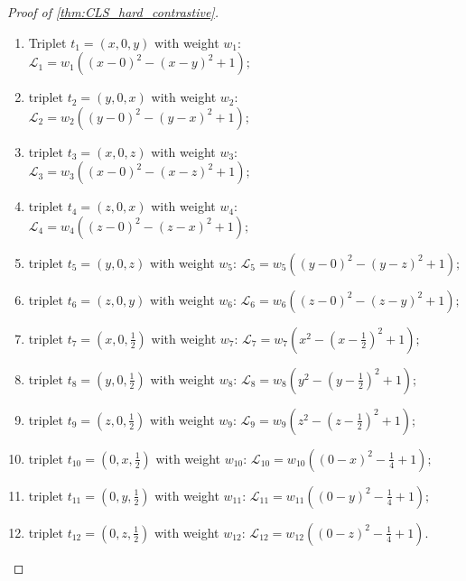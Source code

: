 \documentclass{article}
\theoremstyle{definition}  %
\theoremstyle{plain}
\numberwithin{observation}{section}
\numberwithin{claim}{section}
\numberwithin{fact}{section}
\numberwithin{lemma}{section}
\numberwithin{proposition}{section}
\numberwithin{theorem}{section}
\numberwithin{corollary}{section}
\numberwithin{definition}{section}
\theoremstyle{plain}
\begin{document}
\begin{proof}[Proof of \cref{thm:CLS_hard_contrastive}]
\begin{enumerate}[label = ]
    \item Triplet $t_1 = (x, 0, y)$ with weight $w_1$: $\mathcal{L}_1 = w_1 \left((x - 0)^2 - (x - y)^2 + 1\right);$
    \item triplet $t_2 = (y, 0, x)$ with weight $w_2$: $\mathcal{L}_2 = w_2 \left((y - 0)^2 - (y - x)^2 + 1\right);$
    \item triplet $t_3 = (x, 0, z)$ with weight $w_3$: $\mathcal{L}_3 = w_3 \left((x - 0)^2 - (x - z)^2 + 1\right);$
    \item triplet $t_4 = (z, 0, x)$ with weight $w_4$: $\mathcal{L}_4 = w_{4} \left((z - 0)^2 - (z - x)^2 + 1\right);$
    \item triplet $t_5 = (y, 0, z)$ with weight $w_5$: $\mathcal{L}_5 = w_{5} \left((y - 0)^2 - (y - z)^2 + 1\right);$
    \item triplet $t_6 = (z, 0, y)$ with weight $w_6$: $\mathcal{L}_6 = w_{6} \left((z - 0)^2 - (z - y)^2 + 1\right);$
    \item triplet $t_7 = (x, 0, \frac{1}{2})$ with weight $w_7$: $\mathcal{L}_7 = w_{7} \left(x^2 - (x - \frac{1}{2})^2 + 1\right);$
    \item triplet $t_8 = (y, 0, \frac{1}{2})$ with weight $w_8$: $\mathcal{L}_8 = w_{8} \left(y^2 - (y - \frac{1}{2})^2 + 1\right);$
    \item triplet $t_9 = (z, 0, \frac{1}{2})$ with weight $w_9$: $\mathcal{L}_9 = w_{9} \left(z^2 - (z - \frac{1}{2})^2 + 1\right);$
    \item triplet $t_{10} = (0, x, \frac{1}{2})$ with weight $w_{10}$: $\mathcal{L}_{10} = w_{10} \left((0 - x)^2 - \frac{1}{4} + 1\right);$
    \item triplet $t_{11} = (0, y, \frac{1}{2})$ with weight $w_{11}$: $\mathcal{L}_{11} = w_{11} \left((0 - y)^2 - \frac{1}{4} + 1\right);$
    \item triplet $t_{12} = (0, z, \frac{1}{2})$ with weight $w_{12}$: $\mathcal{L}_{12} = w_{12} \left((0 - z)^2 - \frac{1}{4} + 1\right).$
    

\end{enumerate}
\end{proof}
\end{document}
